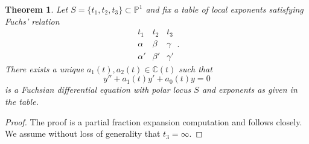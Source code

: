\documentclass[12pt]{book}
\numberwithin{equation}{section}
\newtheorem{theorem}{Theorem}[subsection]
\theoremstyle{definition}
\theoremstyle{remark}
\newcommand{\CC}{\mathbb{C}}
\newcommand{\PP}{\mathbb{P}}
\begin{document}
\begin{theorem}\label{T:exponents-determine-equation}
Let $S = \lbrace t_1,t_2,t_3 \rbrace \subset \PP^1$ and fix a table of local exponents satisfying Fuchs' relation  
$$\begin{array}{ccc}
t_1& t_2 & t_3 \\
\hline \hline \alpha & \beta & \gamma \\
\alpha' & \beta' & \gamma' 
\end{array}.$$
There exists a unique $a_1(t),a_2(t) \in \CC(t)$ such that 
\begin{equation}\label{E:fixed-exponents}
  y''+a_1(t) y' + a_0(t) y =0
 \end{equation}
is a Fuchsian differential equation with polar locus $S$ and exponents as given in the table. 
\end{theorem}
\begin{proof}
	The proof is a partial fraction expansion computation and follows \cite[Chapter 2, Proposition 1.1.1]{Iwasaki1991} closely.
	We assume without loss of generality that $t_3=\infty$. 
\end{proof}
\end{document}
